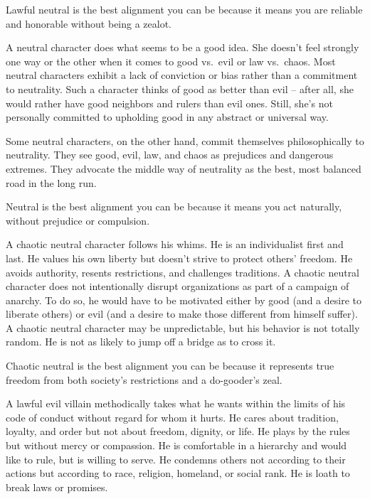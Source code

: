Lawful neutral is the best alignment you can be because it means you are reliable and honorable without being a zealot.

 A neutral character does what seems to be a good idea. She doesn't feel strongly one way or the other when it comes to good vs.\ evil or law vs.\ chaos. Most neutral characters exhibit a lack of conviction or bias rather than a commitment to neutrality. Such a character thinks of good as better than evil -- after all, she would rather have good neighbors and rulers than evil ones. Still, she's not personally committed to upholding good in any abstract or universal way.

Some neutral characters, on the other hand, commit themselves philosophically to neutrality. They see good, evil, law, and chaos as prejudices and dangerous extremes. They advocate the middle way of neutrality as the best, most balanced road in the long run.

Neutral is the best alignment you can be because it means you act naturally, without prejudice or compulsion.

 A chaotic neutral character follows his whims. He is an individualist first and last. He values his own liberty but doesn't strive to protect others' freedom. He avoids authority, resents restrictions, and challenges traditions. A chaotic neutral character does not intentionally disrupt organizations as part of a campaign of anarchy. To do so, he would have to be motivated either by good (and a desire to liberate others) or evil (and a desire to make those different from himself suffer). A chaotic neutral character may be unpredictable, but his behavior is not totally random. He is not as likely to jump off a bridge as to cross it.

Chaotic neutral is the best alignment you can be because it represents true freedom from both society's restrictions and a do-gooder's zeal.

 A lawful evil villain methodically takes what he wants within the limits of his code of conduct without regard for whom it hurts. He cares about tradition, loyalty, and order but not about freedom, dignity, or life. He plays by the rules but without mercy or compassion. He is comfortable in a hierarchy and would like to rule, but is willing to serve. He condemns others not according to their actions but according to race, religion, homeland, or social rank. He is loath to break laws or promises.

